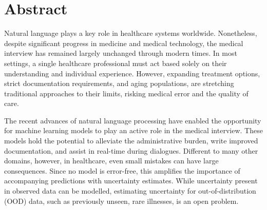

\chapter[abstract]{Abstract}

%
%

Natural language plays a key role in healthcare systems worldwide. 
Nonetheless, despite significant progress in medicine and medical technology, the medical interview has remained largely unchanged through modern times. 
In most settings, a single healthcare professional must act based solely on their understanding and individual experience. 
However, expanding treatment options, strict documentation requirements, and aging populations, are stretching traditional approaches to their limits, risking medical error and the quality of care. 

The recent advances of natural language processing have enabled the opportunity for machine learning models to play an active role in the medical interview. 
These models hold the potential to alleviate the administrative burden, write improved documentation, and assist in real-time during dialogues. 
Different to many other domains, however, in healthcare, even small mistakes can have large consequences. 
Since no model is error-free, this amplifies the importance of accompanying predictions with uncertainty estimates. 
While uncertainty present in observed data can be modelled, estimating uncertainty for out-of-distribution (OOD) data, such as previously unseen, rare illnesses, is an open problem. 

